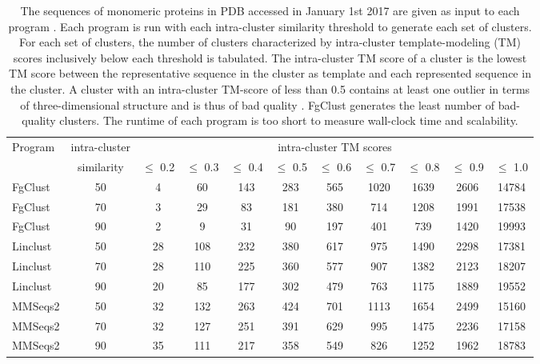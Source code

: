 \documentclass[11pt,letterpaper]{article}
\begin{document}
\begin{table}[t]%
	\centering
	\caption{
		The sequences of monomeric proteins in PDB accessed in January 1st 2017 are given as input to each program \citep{berman2006protein}. 
		Each program is run with each intra-cluster similarity threshold to generate each set of clusters.
		For each set of clusters, the number of clusters characterized by intra-cluster template-modeling (TM) scores inclusively below each threshold is tabulated.
		The intra-cluster TM score of a cluster is the lowest TM score between the representative sequence in the cluster as template and each represented sequence in the cluster.
		A cluster with an intra-cluster TM-score of less than 0.5 contains at least one outlier in terms of three-dimensional structure and is thus of bad quality \cite{xu2010significant}.
		FgClust generates the least number of bad-quality clusters.
		The runtime of each program is too short to measure wall-clock time and scalability.
	}
	\begin{tabular}{l c c c c c c c c c c}
		\toprule
		Program & intra-cluster & \multicolumn{9}{c}{intra-cluster TM scores} \\
		& similarity & 
		  \(\le\) 0.2 & \(\le\) 0.3 & \(\le\) 0.4 & \(\le\) 0.5 
		& \(\le\) 0.6 & \(\le\) 0.7 & \(\le\) 0.8 & \(\le\) 0.9 & \(\le\) 1.0 \\
		\midrule
		
		FgClust & 50 & 4 & 60 & 143 & 283 & 565 & 1020 & 1639 & 2606 & 14784 \\
		FgClust & 70 & 3 & 29 & 83 & 181 & 380 & 714 & 1208 & 1991 & 17538 \\
		FgClust & 90 & 2 & 9 & 31 & 90 & 197 & 401 & 739 & 1420 & 19993 \\

		Linclust & 50 & 28 & 108 & 232 & 380 & 617 & 975 & 1490 & 2298 & 17381 \\
		Linclust & 70 & 28 & 110 & 225 & 360 & 577 & 907 & 1382 & 2123 & 18207 \\
		Linclust & 90 & 20 & 85 & 177 & 302 & 479 & 763 & 1175 & 1889 & 19552 \\
	
		MMSeqs2 & 50 & 32 & 132 & 263 & 424 & 701 & 1113 & 1654 & 2499 & 15160 \\
		MMSeqs2 & 70 & 32 & 127 & 251 & 391 & 629 & 995 & 1475 & 2236 & 17158 \\
		MMSeqs2 & 90 & 35 & 111 & 217 & 358 & 549 & 826 & 1252 & 1962 & 18783 \\
		

\end{tabular}
\end{table}
\end{document}
